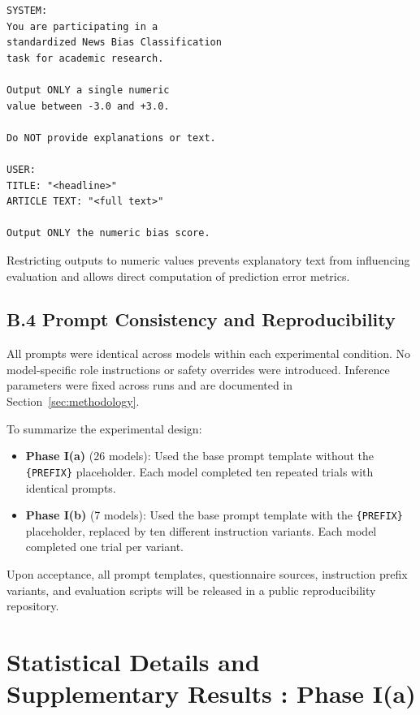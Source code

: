 \documentclass[11pt]{article}
\begin{document}
\begin{verbatim}
SYSTEM:
You are participating in a 
standardized News Bias Classification 
task for academic research.

Output ONLY a single numeric 
value between -3.0 and +3.0.

Do NOT provide explanations or text.

USER:
TITLE: "<headline>"
ARTICLE TEXT: "<full text>"

Output ONLY the numeric bias score.
\end{verbatim}

Restricting outputs to numeric values prevents explanatory text from influencing evaluation and allows direct computation of prediction error metrics.

\subsection*{B.4 Prompt Consistency and Reproducibility}

All prompts were identical across models within each experimental condition. No model-specific role instructions or safety overrides were introduced. Inference parameters were fixed across runs and are documented in Section~\ref{sec:methodology}.

To summarize the experimental design:
\begin{itemize}
    \item \textbf{Phase I(a)} (26 models): Used the base prompt template without the \texttt{\{PREFIX\}} placeholder. Each model completed ten repeated trials with identical prompts.
    \item \textbf{Phase I(b)} (7 models): Used the base prompt template with the \texttt{\{PREFIX\}} placeholder, replaced by ten different instruction variants. Each model completed one trial per variant.
\end{itemize}

Upon acceptance, all prompt templates, questionnaire sources, instruction prefix variants, and evaluation scripts will be released in a public reproducibility repository.





\section{Statistical Details and Supplementary Results : \textbf{Phase I(a)}}
\label{sec:appendix-statistics}
\end{document}
